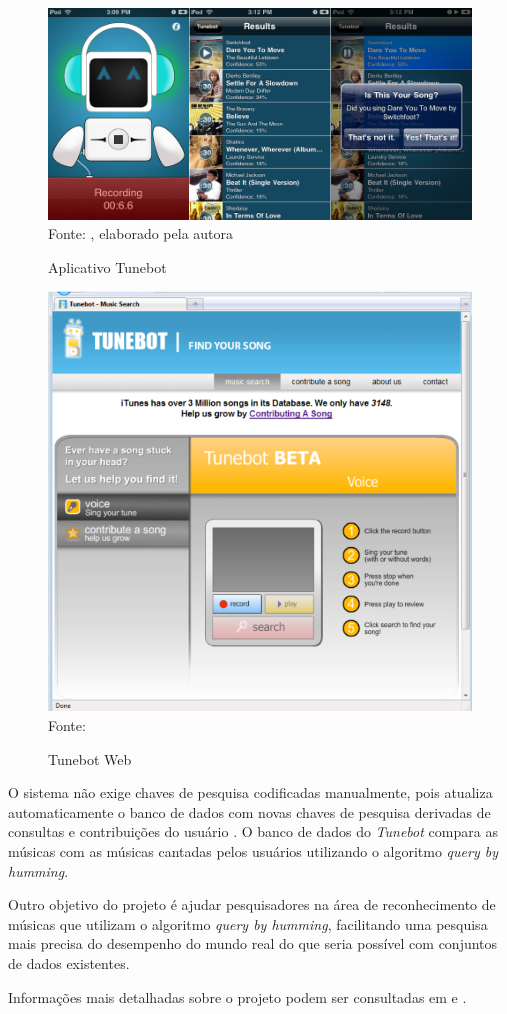 \begin{figure}[!htb]
   \centering
   \caption{Aplicativo Tunebot}\label{fig:tunebotIphone} 
   \includegraphics[scale=0.30]{figuras/tunebot-iphone.png}
   \\Fonte: \cite{tunebotiOS}, elaborado pela autora
\end{figure}

\begin{figure}[!htb]
   \centering
   \caption{Tunebot Web}\label{fig:tunebotWeb} 
   \includegraphics[scale=0.5]{figuras/tunebotWeb.png}
   \\Fonte: \cite{pardo2010}
\end{figure}

O sistema não exige chaves de pesquisa codificadas manualmente, pois atualiza automaticamente o banco de dados com novas chaves de pesquisa derivadas de consultas e contribuições do usuário \cite{pardo2010}. O banco de dados do \textit{Tunebot} compara as músicas com as músicas cantadas pelos usuários utilizando o algoritmo \textit{query by humming}.

Outro objetivo do projeto é ajudar pesquisadores na área de reconhecimento de músicas que utilizam o algoritmo \textit{query by humming}, facilitando uma pesquisa mais precisa do desempenho do mundo real do que seria possível com conjuntos de dados existentes.

Informações mais detalhadas sobre o projeto podem ser consultadas em \cite{pardo2010, pardo2012} e \cite{huq2010}.
